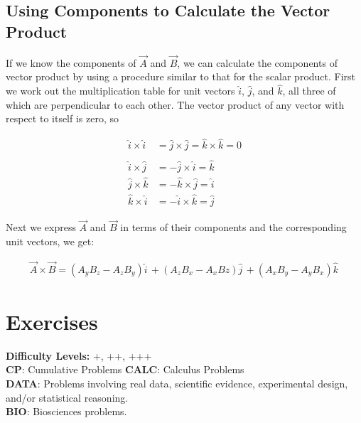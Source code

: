\subsection*{Using Components to Calculate the Vector Product}
If we know the components of $\overrightarrow{A}$ and $\overrightarrow{B}$, we can calculate the components of vector product by using a procedure similar to that for the scalar product. First we work out the multiplication table for unit vectors $\hat{i}$, $\hat{j}$, and $\hat{k}$, all three of which are perpendicular to each other. The vector product of any vector with respect to itself is zero, so
\begin{mathbox}
\begin{align*}
\hat{i} \times \hat{i} &= \hat{j} \times \hat{j} = \hat{k} \times \hat{k} = 0\\\\
\hat{i} \times \hat{j} &= - \hat{j} \times \hat{i} = \hat{k}\\
\hat{j} \times \hat{k} &= - \hat{k} \times \hat{j} = \hat{i}\\
\hat{k} \times \hat{i} &= -\hat{i} \times \hat{k} = \hat{j}
\end{align*}
\end{mathbox}
 
Next we express $\overrightarrow{A}$ and $\overrightarrow{B}$ in terms of their components and the corresponding unit vectors, we get:
\begin{mathbox}
\begin{align*}
\overrightarrow{A} \times \overrightarrow{B} = \left(A_yB_z - A_zB_y\right)\hat{i}\, + \left(A_zB_x - A_xBz\right)\hat{j}\, + \left(A_xB_y - A_yB_x\right)\hat{k}\,
\end{align*}
\end{mathbox}

\pagebreak

\section{Exercises}

\begin{legendbox}
\textbf{Difficulty Levels:} +, ++, +++\\
\textbf{CP}: Cumulative Problems \qquad \textbf{CALC}: Calculus Problems\\
\textbf{DATA}: Problems involving real data, scientific evidence, experimental design, and/or statistical reasoning.\\
\textbf{BIO}: Biosciences problems.
\end{legendbox}


